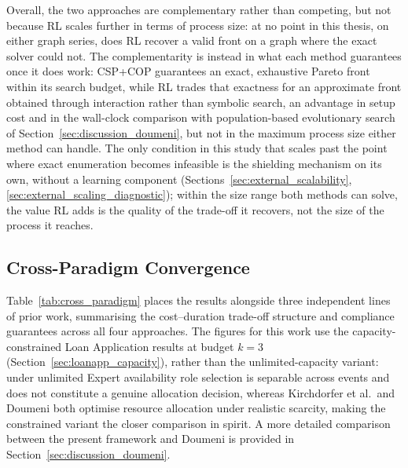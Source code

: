 Overall, the two approaches are complementary rather than competing, but not because \ac{RL} scales further in terms of process size: at no point in this thesis, on either graph series, does \ac{RL} recover a valid front on a graph where the exact solver could not. The complementarity is instead in what each method guarantees once it does work: CSP+COP guarantees an exact, exhaustive Pareto front within its search budget, while \ac{RL} trades that exactness for an approximate front obtained through interaction rather than symbolic search, an advantage in setup cost and in the wall-clock comparison with population-based evolutionary search of Section~\ref{sec:discussion_doumeni}, but not in the maximum process size either method can handle. The only condition in this study that scales past the point where exact enumeration becomes infeasible is the shielding mechanism on its own, without a learning component (Sections~\ref{sec:external_scalability}, \ref{sec:external_scaling_diagnostic}); within the size range both methods can solve, the value \ac{RL} adds is the quality of the trade-off it recovers, not the size of the process it reaches.

\subsection{Cross-Paradigm Convergence}
\label{sec:discussion_cross_paradigm}

Table~\ref{tab:cross_paradigm} places the results alongside three independent lines of prior work, summarising the cost--duration trade-off structure and compliance guarantees across all four approaches. The figures for this work use the capacity-constrained Loan Application results at budget $k=3$ (Section~\ref{sec:loanapp_capacity}), rather than the unlimited-capacity variant: under unlimited Expert availability role selection is separable across events and does not constitute a genuine allocation decision, whereas Kirchdorfer et al.\ and Doumeni both optimise resource allocation under realistic scarcity, making the constrained variant the closer comparison in spirit. A more detailed comparison between the present framework and Doumeni is provided in Section~\ref{sec:discussion_doumeni}.

